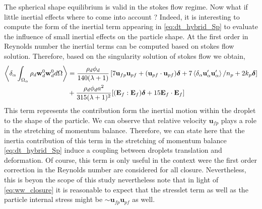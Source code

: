 The spherical shape equilibrium is valid in the stokes flow regime. 
Now what if little inertial effects where to come into account  ?
Indeed, it is interesting to compute the form of the inertial term appearing in \ref{eq:dt_hybrid_Sp} to evaluate the influence of small inertial effects on the particle shape. 
At the first order in Reynolds number the inertial terms can be computed based on stokes flow solution. 
Therefore, based on the singularity solution of stokes flow we obtain, 
\begin{align*}
    \left<\delta_\alpha \int_{\Omega_{\alpha}} \rho_d \textbf{w}_d^0  \textbf{w}_d^0  d\Omega\right>
    &= \frac{\rho_d \phi_d}{140(\lambda +1 )}
    \left[
        7\textbf{u}_{fp}\textbf{u}_{pf} 
    + (\textbf{u}_{pf}\cdot \textbf{u}_{pf})\bm\delta
    + 7\left<\delta_\alpha \textbf{u}_\alpha'\textbf{u}_\alpha'\right>/n_p 
    + 2k_p \bm\delta
    \right]\\
    &+ \frac{\rho_d \phi_d a^2}{315 (\lambda + 1)^2}[(\textbf{E}_f : \textbf{E}_f)\bm\delta+15\textbf{E}_f\cdot \textbf{E}_f]
    \label{eq:ww_closure}
\end{align*}
This term represents the contribution form the inertial motion within the droplet to the shape of the particle. 
We can observe that relative velocity $\textbf{u}_{fp}$ plays a role in the stretching of momentum balance. 
Therefore, we can state here that the inertia contribution of this term in the stretching of momentum balance \ref{eq:dt_hybrid_Sp} induce a coupling between droplets translation and deformation. 
Of course, this term is only useful in the context were the first order correction in the Reynolds number are considered for all closure. 
Nevertheless, this is beyon the scope of this study nevertheless note that in light of \ref{eq:ww_closure} it is reasonable to expect that the stresslet term as well as the particle internal stress might be $\sim \textbf{u}_{fp}\textbf{u}_{pf} $ as well. 
